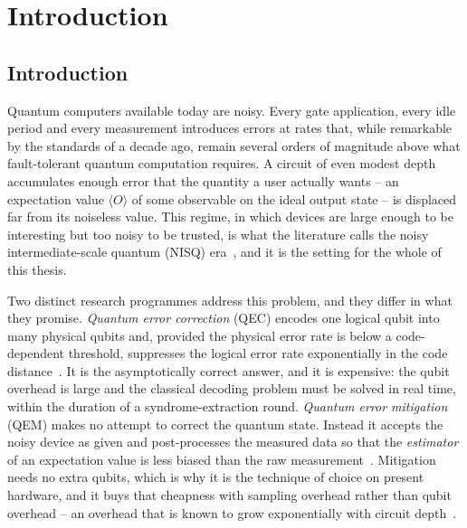 \documentclass[Thesis.tex]{subfiles}
\begin{document}
\newpage
\setcounter{chapter}{0} %


\thispagestyle{empty}

\chapter{Introduction}\label{chap1:introduction}

\section{Introduction}

Quantum computers available today are noisy. Every gate application, every idle
period and every measurement introduces errors at rates that, while remarkable by
the standards of a decade ago, remain several orders of magnitude above what
fault-tolerant quantum computation requires. A circuit of even modest depth
accumulates enough error that the quantity a user actually wants -- an expectation
value $\langle O \rangle$ of some observable on the ideal output state -- is
displaced far from its noiseless value. This regime, in which devices are large
enough to be interesting but too noisy to be trusted, is what the literature calls
the noisy intermediate-scale quantum (NISQ) era~\cite{preskill2018nisq,bharti2022noisy}, and it is the setting for the whole
of this thesis.

Two distinct research programmes address this problem, and they differ in what they
promise. \emph{Quantum error correction} (QEC) encodes one logical qubit into many
physical qubits and, provided the physical error rate is below a code-dependent
threshold, suppresses the logical error rate exponentially in the code
distance~\cite{dennis2002topological,fowler2012surface,google2025below}. It
is the asymptotically correct answer, and it is expensive: the qubit overhead is
large and the classical decoding problem must be solved in real time, within the
duration of a syndrome-extraction round. \emph{Quantum error mitigation} (QEM) makes
no attempt to correct the quantum state. Instead it accepts the noisy device as
given and post-processes the measured data so that the \emph{estimator} of an
expectation value is less biased than the raw measurement~\cite{temme2017error,li2017efficient,cai2023review}.
Mitigation needs no extra qubits, which is why it is the technique of choice on present hardware, and it buys
that cheapness with sampling overhead rather than qubit overhead -- an overhead
that is known to grow exponentially with circuit
depth~\cite{takagi2022fundamental,quek2024exponentially}.
\end{document}
